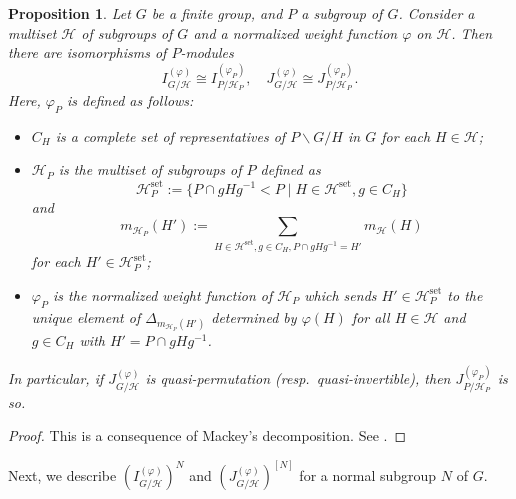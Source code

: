 \documentclass[12pt]{amsart}
\theoremstyle{plain}
\newtheorem{prop}[thm]{Proposition}
\theoremstyle{definition}
\numberwithin{thm}{section}
\numberwithin{equation}{section}
\newcommand{\cH}{\mathcal{H}}
\DeclareMathOperator{\set}{set}
\begin{document}
\begin{prop}\label{prop:rtmc}
Let $G$ be a finite group, and $P$ a subgroup of $G$. Consider a multiset $\cH$ of subgroups of $G$ and a normalized weight function $\varphi$ on $\cH$. Then there are isomorphisms of $P$-modules
\begin{equation*}
    I_{G/\cH}^{(\varphi)}\cong I_{P/\cH_{P}}^{(\varphi_{P})},\quad J_{G/\cH}^{(\varphi)}\cong J_{P/\cH_{P}}^{(\varphi_{P})}. 
\end{equation*}
Here, $\varphi_{P}$ is defined as follows:
\begin{itemize}
    \item $C_{H}$ is a complete set of representatives of $P\backslash G/H$ in $G$ for each $H \in \cH$; 
    \item $\cH_{P}$ is the multiset of subgroups of $P$ defined as
    \begin{equation*}
        \cH_{P}^{\set}:=\{P\cap gHg^{-1}<P\mid H\in \cH^{\set},g\in C_{H}\}
    \end{equation*}
    and 
    \begin{equation*}
        m_{\cH_{P}}(H'):=\sum_{H\in \cH^{\set},g\in C_{H},P\cap gHg^{-1}=H'}m_{\cH}(H)
    \end{equation*}
    for each $H'\in \cH_{P}^{\set}$; 
    \item $\varphi_{P}$ is the normalized weight function of $\cH_{P}$ which sends $H'\in \cH_{P}^{\set}$ to the unique element of $\Delta_{m_{\cH_{P}}(H')}$ determined by $\varphi(H)$ for all $H\in \cH$ and $g\in C_{H}$ with $H'=P\cap gHg^{-1}$. 
\end{itemize}
In particular, if $J_{G/\cH}^{(\varphi)}$ is quasi-permutation (resp.~quasi-invertible), then $J_{P/\cH_{P}}^{(\varphi_{P})}$ is so. 
\end{prop}

\begin{proof}
This is a consequence of Mackey's decomposition. See \cite[Section 7.3, Proposition 22]{Serre1977}. 
\end{proof}

Next, we describe $(I_{G/\cH}^{(\varphi)})^{N}$ and $(J_{G/\cH}^{(\varphi)})^{[N]}$ for a normal subgroup $N$ of $G$. 
\end{document}
